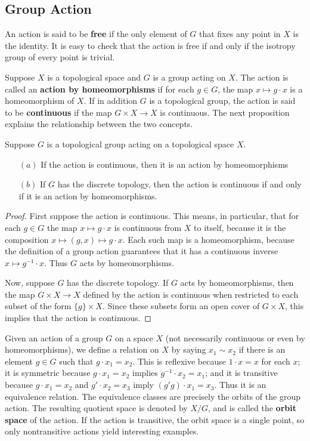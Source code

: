\subsection{Group Action}
An action is said to be \textbf{free} if the only element of $G$ that fixes any point in $X$ is the identity. It is easy to check that the action is free if and only if the isotropy group of every point is trivial.\par
Suppose $X$ is a topological space and $G$ is a group acting on $X$. The action is called an \textbf{action by homeomorphisms} if for each $g\in G$, the map $x\mapsto g\cdot x$ is a homeomorphism of $X$. If
in addition $G$ is a topological group, the action is said to be \textbf{continuous} if the map $G\times X\to X$ is continuous. The next proposition explains the relationship between the two concepts.
\begin{proposition}
Suppose $G$ is a topological group acting on a topological space
$X$.
\begin{itemize}
\item[$(a)$]If the action is continuous, then it is an action by homeomorphisms
\item[$(b)$]If $G$ has the discrete topology, then the action is continuous if and only if it is an action by homeomorphisms.
\end{itemize}
\end{proposition}
\begin{proof}
First suppose the action is continuous. This means, in particular, that for each $g\in G$ the map $x\mapsto g\cdot x$ is continuous from $X$ to itself, because it is the composition $x\mapsto(g,x)\mapsto g\cdot x$. Each such map is a homeomorphism, because the definition of
a group action guarantees that it has a continuous inverse $x\mapsto g^{-1}\cdot x$. Thus $G$ acts by homeomorphisms.\par
Now, suppose $G$ has the discrete topology. If $G$ acts by homeomorphisms, then the map $G\times X\to X$ defined by the action is continuous when restricted to each subset of the form $\{g\}\times X$. Since these subsets form an open cover of $G\times X$, this implies that the action is continuous.
\end{proof}
Given an action of a group $G$ on a space $X$ (not necessarily continuous or even by homeomorphisms), we define a relation on $X$ by saying $x_1\sim x_2$ if there is an element $g\in G$ such that $g\cdot x_1=x_2$. This is reflexive because $1\cdot x=x$ for each $x$; it is symmetric because $g\cdot x_1=x_2$ implies $g^{-1}\cdot x_2=x_1$; and it is transitive because $g\cdot x_1=x_2$ and $g'\cdot x_2=x_3$ imply $(g'g)\cdot x_1=x_3$. Thus it is an equivalence relation. The equivalence classes are precisely the orbits of the group action. The resulting quotient space is denoted by $X/G$, and is called the \textbf{orbit space} of the action. If the action is transitive, the orbit space is a single point, so only nontransitive actions yield interesting examples.
